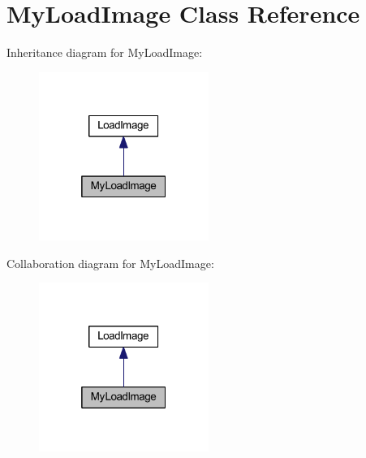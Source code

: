 \hypertarget{class_my_load_image}{}\section{My\+Load\+Image Class Reference}
\label{class_my_load_image}


Inheritance diagram for My\+Load\+Image\+:
\nopagebreak
\begin{figure}[H]
\begin{center}
\leavevmode
\includegraphics[width=157pt]{class_my_load_image__inherit__graph}
\end{center}
\end{figure}


Collaboration diagram for My\+Load\+Image\+:
\nopagebreak
\begin{figure}[H]
\begin{center}
\leavevmode
\includegraphics[width=157pt]{class_my_load_image__coll__graph}
\end{center}
\end{figure}
